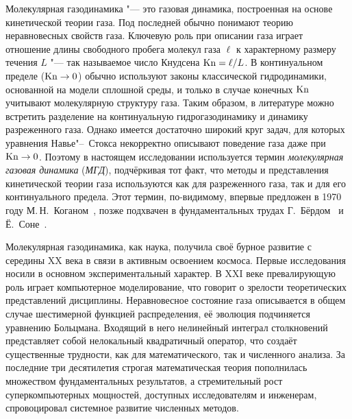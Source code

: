 Молекулярная газодинамика "--- это газовая динамика, построенная на основе кинетической теории газа.
Под последней обычно понимают теорию неравновесных свойств газа.
Ключевую роль при описании газа играет отношение длины свободного пробега молекул газа \(\ell\)
к характерному размеру течения \(L\) "--- так называемое число Кнудсена \(\mathrm{Kn}=\ell/L\).
В континуальном пределе (\(\mathrm{Kn}\to0\)) обычно используют законы классической гидродинамики,
основанной на модели сплошной среды, и только в случае конечных \(\mathrm{Kn}\)
учитывают молекулярную структуру газа. Таким образом, в литературе можно встретить
разделение на континуальную гидрогазодинамику и динамику разреженного газа.
Однако имеется достаточно широкий круг задач, для которых уравнения Навье"--~Стокса
некорректно описывают поведение газа даже при \(\mathrm{Kn}\to0\).
Поэтому в настоящем исследовании используется термин \emph{молекулярная газовая динамика} (\emph{МГД}),
подчёркивая тот факт, что методы и представления кинетической теории газа используются
как для разреженного газа, так и для его континуального предела.
Этот термин, по-видимому, впервые предложен в 1970 году М.\,Н.~Коганом~\autocite{Kogan1971review},
позже подхвачен в фундаментальных трудах Г.~Бёрдом~\autocite{Bird1981} и Ё.~Соне~\autocite{Sone2007}.

{\actuality}
Молекулярная газодинамика, как наука, получила своё бурное развитие с середины XX века
в связи в активным освоением космоса. Первые исследования носили в основном экспериментальный
характер. В XXI веке превалирующую роль играет компьютерное моделирование, что
говорит о зрелости теоретических представлений дисциплины.
Неравновесное состояние газа описывается в общем случае шестимерной функцией распределения,
её эволюция подчиняется уравнению Больцмана.
Входящий в него нелинейный интеграл столкновений представляет собой нелокальный квадратичный оператор,
что создаёт существенные трудности, как для математического, так и численного анализа.
За последние три десятилетия строгая математическая теория пополнилась множеством фундаментальных результатов,
а стремительный рост суперкомпьютерных мощностей, доступных исследователям и инженерам,
спровоцировал системное развитие численных методов.

